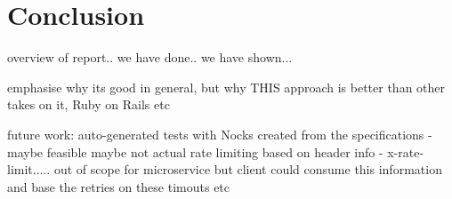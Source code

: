 \chapter{Conclusion}

overview of report.. we have done.. we have shown...

emphasise why its good in general, but why THIS approach is better than other takes on it, Ruby on Rails etc

future work: auto-generated tests with Nocks created from the specifications - maybe feasible maybe not
             actual rate limiting based on header info - x-rate-limit..... out of scope for microservice but client
            could consume this information and base the retries on these timouts etc